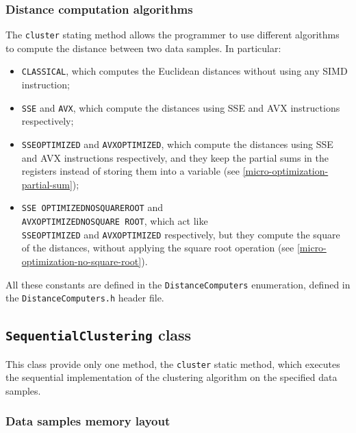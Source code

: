 \documentclass{article}
\begin{document}
\hypertarget{distance-computation-algorithms}{
\subsubsection{Distance computation algorithms}
\label{distance-computation-algorithms}}

The \texttt{cluster} stating method allows the programmer to use different algorithms to compute
the distance between two data samples. In particular:
\begin{itemize}
\item \texttt{CLASSICAL}, which computes the Euclidean distances without using any SIMD
instruction;
\item \texttt{SSE} and \texttt{AVX}, which compute the distances using SSE and AVX
instructions respectively;
\item \texttt{SSE\textunderscore OPTIMIZED} and \texttt{AVX\textunderscore OPTIMIZED}, which
compute the distances using
SSE and AVX instructions respectively, and they keep the partial sums in the registers
instead of storing them into a variable (see
\ref{micro-optimization-partial-sum});
\item \texttt{SSE\textunderscore
OPTIMIZED\textunderscore NO\textunderscore SQUARE\textunderscore ROOT} and\\
\texttt{AVX\textunderscore OPTIMIZED\textunderscore NO\textunderscore SQUARE\textunderscore
ROOT}, which act like\\ \texttt{SSE\textunderscore OPTIMIZED} and
\texttt{AVX\textunderscore OPTIMIZED} respectively, but they compute the square of the distances,
without applying the square root operation (see \ref{micro-optimization-no-square-root}).
\end{itemize}

All these constants are defined in the \texttt{DistanceComputers} enumeration, defined in the
\texttt{DistanceComputers.h} header file.

\hypertarget{sequential-clustering}{
\subsection{\texttt{SequentialClustering} class}
\label{sequential-clustering}}

This class provide only one method, the \texttt{cluster} static method, which executes the
sequential implementation of the clustering algorithm on the specified data samples.

\hypertarget{seq-data-samples-layout}{
\subsubsection{Data samples memory layout}
\label{seq-data-samples-layout}}
\end{document}
